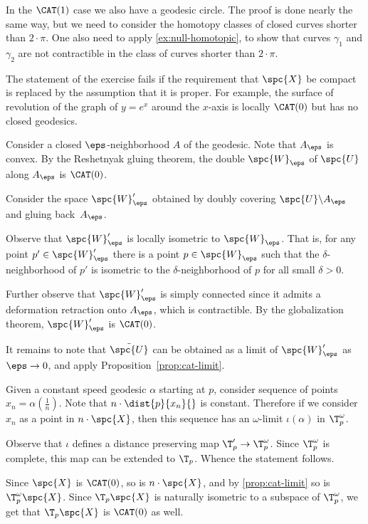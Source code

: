 In the $\CAT(1)$ case we also have a geodesic circle.
The proof is done nearly the same way, but we need to consider the homotopy classes of closed curves shorter than $2\cdot \pi$.
One also need to apply \ref{ex:null-homotopic}, to show that curves $\gamma_1$ and $\gamma_2$ are not contractible in the class of curves shorter than $2\cdot \pi$.

The statement of the exercise fails if the requirement that $\spc{X}$ be compact is replaced by the assumption that it is proper. For example, the surface of revolution of the graph of $y=e^x$ around the $x$-axis is locally $\CAT(0)$ but has no closed geodesics.


Consider a closed $\eps$-neighborhood $A$ of the geodesic.
Note that $A_\eps$ is convex.
By the Reshetnyak gluing theorem, the double $\spc{W}_\eps$ of $\spc{U}$ along $A_\eps$ is $\CAT(0)$.

Consider the space $\spc{W}'_\eps$ obtained by doubly covering $\spc{U}\backslash A_\eps$ and gluing back~$A_\eps$.

Observe that $\spc{W}'_\eps$ is locally isometric to $\spc{W}_\eps$. 
That is, for any point $p'\in\spc{W}'_\eps$ there is a point $p\in\spc{W}_\eps$ such that the $\delta$-neighborhood of $p'$ is isometric to the $\delta$-neighborhood of $p$ for all small $\delta>0$.

Further observe that $\spc{W}'_\eps$ is simply connected since it admits a deformation retraction onto $A_\eps$, which is contractible.
By the globalization theorem, $\spc{W}'_\eps$ is $\CAT(0)$.

It remains to note that $\tilde {\spc{U}}$ can be obtained as a limit of $\spc{W}'_\eps$ as $\eps\to 0$, and apply Proposition~\ref{prop:cat-limit}.

 Given a constant speed geodesic $\alpha$ starting at $p$, consider sequence of points $x_n=\alpha(\tfrac1n)$.
Note that $n\cdot\dist{p}{x_n}{}$ is constant.
Therefore if we consider $x_n$ as a point in $n\cdot \spc{X}$, then this sequence has an $\omega$-limit $\iota(\alpha)$ in $\T_p^\omega$.

Observe that $\iota$ defines a distance preserving map $\T_p'\to \T_p^\omega$.
Since $\T_p^\omega$ is complete, this map can be extended to $\T_p$.
Whence the statement follows.

Since $\spc{X}$ is $\CAT(0)$, so is $n\cdot \spc{X}$, and by \ref{prop:cat-limit} so is $\T_p^\omega\spc{X}$.
Since $\T_p\spc{X}$ is naturally isometric to a subspace of $\T_p^\omega$, we get that $\T_p\spc{X}$ is $\CAT(0)$ as well.

